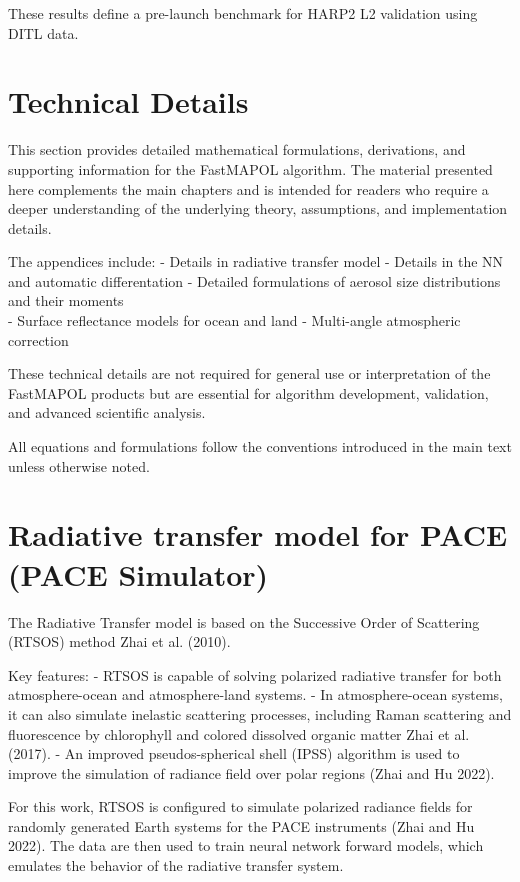 \documentclass[
  11pt,
  letterpaper,
  DIV=11,
  numbers=noendperiod]{scrreprt}
\begin{document}
These results define a pre-launch benchmark for HARP2 L2 validation
using DITL data.

\cleardoublepage
{}
{}
\appendix

\chapter{Technical Details}\label{technical-details}

This section provides detailed mathematical formulations, derivations,
and supporting information for the FastMAPOL algorithm. The material
presented here complements the main chapters and is intended for readers
who require a deeper understanding of the underlying theory,
assumptions, and implementation details.

The appendices include: - Details in radiative transfer model - Details
in the NN and automatic differentation - Detailed formulations of
aerosol size distributions and their moments\\
- Surface reflectance models for ocean and land - Multi-angle
atmospheric correction

These technical details are not required for general use or
interpretation of the FastMAPOL products but are essential for algorithm
development, validation, and advanced scientific analysis.

All equations and formulations follow the conventions introduced in the
main text unless otherwise noted.

\chapter{Radiative transfer model for PACE (PACE
Simulator)}\label{radiative-transfer-model-for-pace-pace-simulator}

The Radiative Transfer model is based on the Successive Order of
Scattering (RTSOS) method Zhai et al. (2010).

Key features: - RTSOS is capable of solving polarized radiative transfer
for both atmosphere-ocean and atmosphere-land systems. - In
atmosphere-ocean systems, it can also simulate inelastic scattering
processes, including Raman scattering and fluorescence by chlorophyll
and colored dissolved organic matter Zhai et al. (2017). - An improved
pseudos-spherical shell (IPSS) algorithm is used to improve the
simulation of radiance field over polar regions (Zhai and Hu 2022).

For this work, RTSOS is configured to simulate polarized radiance fields
for randomly generated Earth systems for the PACE instruments (Zhai and
Hu 2022). The data are then used to train neural network forward models,
which emulates the behavior of the radiative transfer system.
\end{document}
